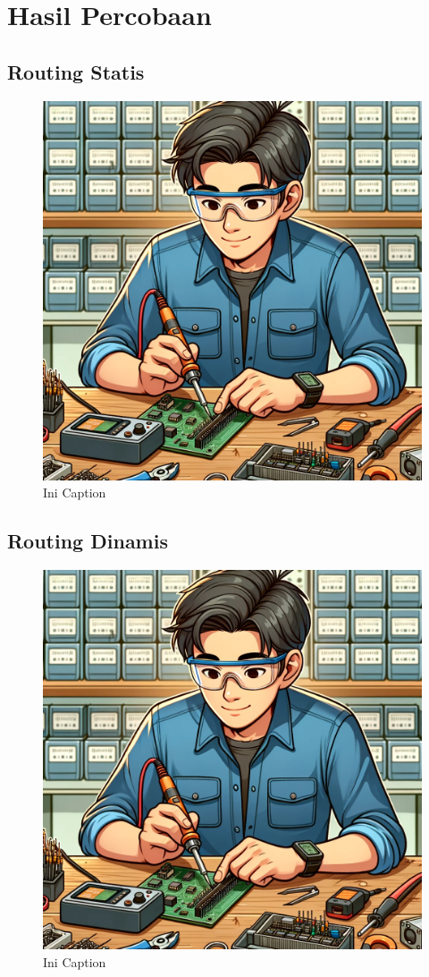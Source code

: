 \section*{Hasil Percobaan} %

\subsection*{Routing Statis}
\begin{figure}[H]
  \centering
  \includegraphics[width=0.5\linewidth]{img/contohgambar.png}
  \caption{Ini Caption}
  \label{fig:iniroutingstatis}
\end{figure}

\subsection*{Routing Dinamis}
\begin{figure}[H]
  \centering
  \includegraphics[width=0.5\linewidth]{img/contohgambar.png}
  \caption{Ini Caption}
  \label{fig:iniroutingdinamis}
\end{figure}
